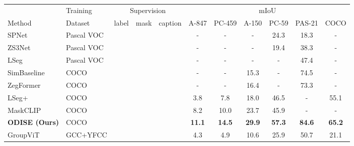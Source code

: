 \documentclass[10pt,twocolumn,letterpaper]{article}
\newcommand{\cmark}{\ding{51}}
\newcommand{\tablestyle}[2]{\setlength{\tabcolsep}{#1}\renewcommand{\arraystretch}{#2}\centering\small}
\newcommand{\ourmethod}{ODISE}
\begin{document}
\begin{table*}[]
\vspace{-.5em}
\tablestyle{8pt}{1.1}
\begin{tabular}{l|l|ccc|cccccc}
                                    & Training   & \multicolumn{3}{c|}{Supervision} & \multicolumn{6}{c}{mIoU}                                                                      \\
Method                            & Dataset    & label    & mask     & caption   & A-847         & PC-459        & A-150         & PC-59         & PAS-21        & COCO          \\
\shline
SPNet\cite{xian2019spnet}         & Pascal VOC & \cmark   & \cmark   &           & -             & -             & -             & 24.3          & 18.3          & -             \\
ZS3Net\cite{bucher2019zs3net}     & Pascal VOC & \cmark   & \cmark   &           & -             & -             & -             & 19.4          & 38.3          & -             \\
LSeg\cite{li2022language}         & Pascal VOC & \cmark   & \cmark   &           & -             & -             & -             & -             & 47.4          & -             \\
SimBaseline\cite{xu2021simple}    & COCO       & \cmark   & \cmark   &           & -             & -             & 15.3          & -             & 74.5          & -             \\
ZegFormer\cite{ding2022zegformer} & COCO       & \cmark   & \cmark   &           & -             & -             & 16.4          & -             & 73.3          & -             \\
LSeg+\cite{ghiasi2021open}        & COCO       & \cmark   & \cmark   &           & 3.8           & 7.8           & 18.0          & 46.5          & -             & 55.1          \\
MaskCLIP\cite{ding2022open}       & COCO       & \cmark   & \cmark   &           & 8.2           & 10.0          & 23.7          & 45.9          & -             & -             \\
\textbf{\ourmethod{} (Ours)}         & COCO       & \cmark   & \cmark   &           & \textbf{11.1} & \textbf{14.5} & \textbf{29.9} & \textbf{57.3} & \textbf{84.6} & \textbf{65.2} \\
\hline
\hline
GroupViT\cite{xu2022groupvit}     & GCC+YFCC   &          &          & \cmark    & 4.3           & 4.9           & 10.6          & 25.9          & 50.7          & 21.1          \\

\end{tabular}
\end{table*}
\end{document}
